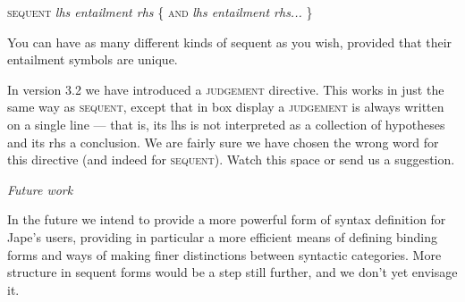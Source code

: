 \textsc{sequent} \textit{lhs entailment rhs} \{ \textsc{and} \textit{lhs entailment rhs...} \}


You can have as many different kinds of sequent as you wish, provided that their entailment symbols are unique.


In version 3.2 we have introduced a \textsc{judgement} directive. This works in just the same way as \textsc{sequent}, except that in box display a \textsc{judgement} is always written on a single line --- that is, its lhs is not interpreted as a collection of hypotheses and its rhs a conclusion. We are fairly sure we have chosen the wrong word for this directive (and indeed for \textsc{sequent}). Watch this space or send us a suggestion.


\textit{Future work}


In the future we intend to provide a more powerful form of syntax definition for Jape's users, providing in particular a more efficient means of defining binding forms and ways of making finer distinctions between syntactic categories. More structure in sequent forms would be a step still further, and we don't yet envisage it.


